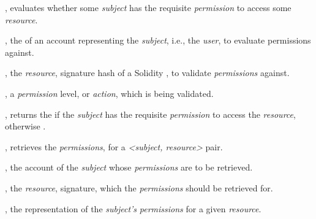 \begin{interface}
  \begin{functions}
    \item {},
      evaluates whether some \emph{subject} has the requisite \emph{permission}
      to access some \emph{resource}.
      \begin{parameters}
        \item {}, the  of an account
          representing the \emph{subject}, i.e., the \emph{user}, to evaluate
          permissions against.
        \item {}, the \emph{resource}, signature hash of a
          Solidity , to validate \emph{permissions} against.
        \item {}, a \emph{permission} level, or
          \emph{action}, which is being validated.
      \end{parameters}
      \begin{returns}
        \item {}, returns the  if the
            \emph{subject} has the requisite \emph{permission} to access the
            \emph{resource}, otherwise .
      \end{returns}

    \item {},
      retrieves the \emph{permissions}, for a \emph{<subject, resource>} pair.

      \begin{parameters}
        \item {}, the account  of the
          \emph{subject} whose \emph{permissions} are to be retrieved.

        \item {}, the \emph{resource}, 
          signature, which the \emph{permissions} should be retrieved for.
      \end{parameters}

      \begin{returns}
      \item {}, the  representation of the
        \emph{subject's} \emph{permissions} for a given \emph{resource}.
      \end{returns}


\end{functions}
\end{interface}
